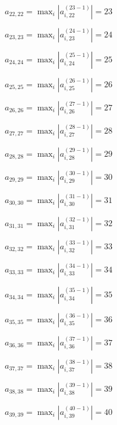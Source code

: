 \documentclass[a4paper,12pt]{article}
\begin{document}
$a _{ 22, 22 } =  \max _i |a _{ i, 22 } ^{ (23 - 1) } | = 23$

$a _{ 23, 23 } =  \max _i |a _{ i, 23 } ^{ (24 - 1) } | = 24$

$a _{ 24, 24 } =  \max _i |a _{ i, 24 } ^{ (25 - 1) } | = 25$

$a _{ 25, 25 } =  \max _i |a _{ i, 25 } ^{ (26 - 1) } | = 26$

$a _{ 26, 26 } =  \max _i |a _{ i, 26 } ^{ (27 - 1) } | = 27$

$a _{ 27, 27 } =  \max _i |a _{ i, 27 } ^{ (28 - 1) } | = 28$

$a _{ 28, 28 } =  \max _i |a _{ i, 28 } ^{ (29 - 1) } | = 29$

$a _{ 29, 29 } =  \max _i |a _{ i, 29 } ^{ (30 - 1) } | = 30$

$a _{ 30, 30 } =  \max _i |a _{ i, 30 } ^{ (31 - 1) } | = 31$

$a _{ 31, 31 } =  \max _i |a _{ i, 31 } ^{ (32 - 1) } | = 32$

$a _{ 32, 32 } =  \max _i |a _{ i, 32 } ^{ (33 - 1) } | = 33$

$a _{ 33, 33 } =  \max _i |a _{ i, 33 } ^{ (34 - 1) } | = 34$

$a _{ 34, 34 } =  \max _i |a _{ i, 34 } ^{ (35 - 1) } | = 35$

$a _{ 35, 35 } =  \max _i |a _{ i, 35 } ^{ (36 - 1) } | = 36$

$a _{ 36, 36 } =  \max _i |a _{ i, 36 } ^{ (37 - 1) } | = 37$

$a _{ 37, 37 } =  \max _i |a _{ i, 37 } ^{ (38 - 1) } | = 38$

$a _{ 38, 38 } =  \max _i |a _{ i, 38 } ^{ (39 - 1) } | = 39$

$a _{ 39, 39 } =  \max _i |a _{ i, 39 } ^{ (40 - 1) } | = 40$
\end{document}
